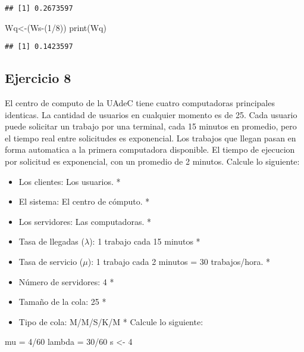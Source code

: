 \documentclass[
]{article}
\newenvironment{Shaded}{\begin{snugshade}}{\end{snugshade}}
\newcommand{\DecValTok}[1]{\textcolor[rgb]{0.00,0.00,0.81}{#1}}
\newcommand{\FunctionTok}[1]{\textcolor[rgb]{0.00,0.00,0.00}{#1}}
\newcommand{\NormalTok}[1]{#1}
\newcommand{\OtherTok}[1]{\textcolor[rgb]{0.56,0.35,0.01}{#1}}
\newcommand{\SpecialCharTok}[1]{\textcolor[rgb]{0.00,0.00,0.00}{#1}}
\begin{document}
\begin{verbatim}
## [1] 0.2673597
\end{verbatim}

\begin{Shaded}
\begin{Highlighting}[]
\NormalTok{Wq}\OtherTok{\textless{}{-}}\NormalTok{(Ws}\SpecialCharTok{{-}}\NormalTok{(}\DecValTok{1}\SpecialCharTok{/}\DecValTok{8}\NormalTok{))}
\FunctionTok{print}\NormalTok{(Wq)}
\end{Highlighting}
\end{Shaded}

\begin{verbatim}
## [1] 0.1423597
\end{verbatim}

\hypertarget{ejercicio-8}{%
\subsection{Ejercicio 8}\label{ejercicio-8}}

El centro de computo de la UAdeC tiene cuatro computadoras principales
identicas. La cantidad de usuarios en cualquier momento es de 25. Cada
usuario puede solicitar un trabajo por una terminal, cada 15 minutos en
promedio, pero el tiempo real entre solicitudes es exponencial. Los
trabajos que llegan pasan en forma automatica a la primera computadora
disponible. El tiempo de ejecucion por solicitud es exponencial, con un
promedio de 2 minutos. Calcule lo siguiente:

\begin{itemize}
\item
  Los clientes: Los usuarios. *
\item
  El sistema: El centro de cómputo. *
\item
  Los servidores: Las computadoras. *
\item
  Tasa de llegadas (\(\lambda\)): 1 trabajo cada 15 minutos *
\item
  Tasa de servicio (\(\mu\)): 1 trabajo cada 2 minutos = 30
  trabajos/hora. *
\item
  Número de servidores: 4 *
\item
  Tamaño de la cola: 25 *
\item
  Tipo de cola: M/M/S/K/M * Calcule lo siguiente:
\end{itemize}

\begin{Shaded}
\begin{Highlighting}[]
\NormalTok{mu }\OtherTok{=} \DecValTok{4}\SpecialCharTok{/}\DecValTok{60}
\NormalTok{lambda }\OtherTok{=} \DecValTok{30}\SpecialCharTok{/}\DecValTok{60}
\NormalTok{s }\OtherTok{\textless{}{-}} \DecValTok{4}
\end{Highlighting}
\end{Shaded}
\end{document}

